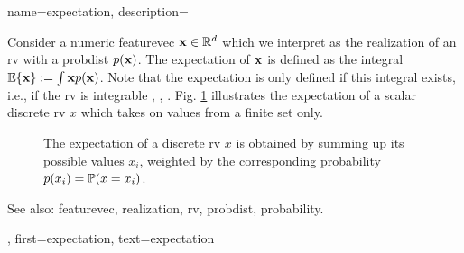 {name={expectation}, 
  description={Consider a numeric \gls{featurevec} ${\bf x} \in \mathbb{R}^{d}$ 
	which we interpret as the \gls{realization} of an \gls{rv} with a \gls{probdist} $p({\bf x})$. 
	The expectation of ${\bf x}$ is defined as the integral $\mathbb{E} \{ {\bf x} \} := \int {\bf x} p({\bf x})$. 
	Note that the expectation is only defined if this integral exists, i.e., if the \gls{rv} is integrable 
	\cite{RudinBookPrinciplesMatheAnalysis}, \cite{BillingsleyProbMeasure}, \cite{HalmosMeasure}. 
	Fig. \ref{fig_expect_discrete} illustrates the expectation of a scalar discrete \gls{rv} $x$ which takes on values 
	from a finite set only. 
   \begin{figure}[H]
   	\begin{center}
\end{center}
\vspace*{-5mm}
\caption{The expectation of a discrete \gls{rv} $x$ is obtained by summing up its possible values $x_{i}$, weighted 
	by the corresponding \gls{probability} $p(x_i) = \mathbb{P}({x= x_i})$. \label{fig_expect_discrete}}
 \end{figure}
		See also: \gls{featurevec}, \gls{realization}, \gls{rv}, \gls{probdist}, \gls{probability}.},
first={expectation},
text={expectation}
}

